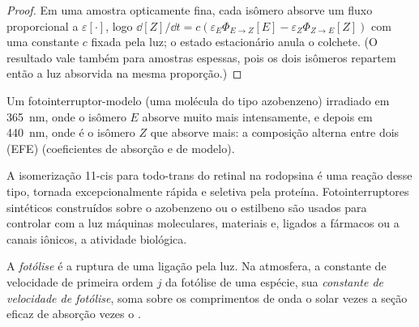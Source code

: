 \begin{proof}
Em uma amostra opticamente fina, cada isômero absorve um fluxo proporcional a $\varepsilon[\cdot]$, logo
$\dd[Z]/\dd t = c(\varepsilon_E\Phi_{E\to Z}[E] - \varepsilon_Z\Phi_{Z\to E}[Z])$ com uma constante $c$ fixada pela luz;
o estado estacionário anula o colchete. (O resultado vale também para amostras
espessas, pois os dois isômeros repartem então a luz absorvida na mesma proporção.)
\end{proof}

\begin{omfigure}

{\small Um fotointerruptor-modelo (uma molécula do tipo azobenzeno) irradiado em \qty{365}{nm},
onde o isômero $E$ absorve muito mais intensamente, e depois em \qty{440}{nm}, onde é o
isômero $Z$ que absorve mais: a composição alterna entre dois 
(EFE) (coeficientes de absorção e  de modelo).}
\end{omfigure}

A isomerização 11-cis para todo-trans do retinal na rodopsina é uma reação desse
tipo, tornada excepcionalmente rápida e seletiva pela proteína. Fotointerruptores
sintéticos construídos sobre o azobenzeno ou o estilbeno são usados para
controlar com a luz máquinas moleculares, materiais e, ligados a fármacos ou a
canais iônicos, a atividade biológica.

\begin{definition}[Fotólise]\label{def:b3:photochemistry:photolysis}
A \emph{fotólise} é a ruptura de uma ligação pela luz. Na
atmosfera, a constante de velocidade de primeira ordem $j$ da fotólise de uma espécie,
sua \emph{constante de velocidade de fotólise}, soma sobre os
comprimentos de onda o  solar vezes a seção eficaz de absorção vezes
o .
\end{definition}

